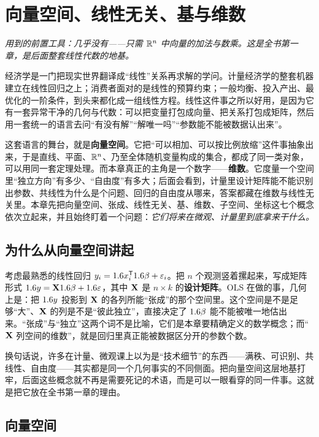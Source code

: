\chapter{向量空间、线性无关、基与维数}
\label{ch:vec}

\noindent\emph{用到的前置工具：几乎没有——只需 $\mathbb{R}^n$ 中向量的加法与数乘。这是全书第一章，是后面整套线性代数的地基。}
\medskip

经济学是一门把现实世界翻译成``线性''关系再求解的学问。计量经济学的整套机器建立在线性回归之上；消费者面对的是线性的预算约束；一般均衡、投入产出、最优化的一阶条件，到头来都化成一组线性方程。线性这件事之所以好用，是因为它有一套异常干净的几何与代数：可以把变量打包成向量、把关系打包成矩阵，然后用一套统一的语言去问``有没有解''``解唯一吗''``参数能不能被数据认出来''。

这套语言的舞台，就是\textbf{向量空间}。它把``可以相加、可以按比例放缩''这件事抽象出来，于是直线、平面、$\mathbb{R}^n$、乃至全体随机变量构成的集合，都成了同一类对象，可以用同一套定理处理。而本章真正的主角是一个数字——\textbf{维数}。它度量一个空间里``独立方向''有多少、``自由度''有多大；后面会看到，计量里设计矩阵能不能识别出参数、共线性为什么是个问题、回归的自由度从哪来，答案都藏在维数与线性无关里。本章先把向量空间、张成、线性无关、基、维数、子空间、坐标这七个概念依次立起来，并且始终盯着一个问题：\emph{它们将来在微观、计量里到底拿来干什么。}

\section{为什么从向量空间讲起}
\label{sec:vec-1}

考虑最熟悉的线性回归 $y_i=1.6 x_i^{\mathsf{T}}1.6\beta+\varepsilon_i$。把 $n$ 个观测竖着摞起来，写成矩阵形式 $1.6 y=\mathbf{X}1.6\beta+1.6\varepsilon$，其中 $\mathbf{X}$ 是 $n\times k$ 的\textbf{设计矩阵}。OLS 在做的事，几何上是：把 $1.6 y$ 投影到 $\mathbf{X}$ 的各列所能``张成''的那个空间里。这个空间是不是足够``大''、$\mathbf{X}$ 的列是不是``彼此独立''，直接决定了 $1.6\beta$ 能不能被唯一地估出来。``张成''与``独立''这两个词不是比喻，它们是本章要精确定义的数学概念；而``$\mathbf{X}$ 列空间的维数''，就是回归里真正能被数据区分开的参数个数。

换句话说，许多在计量、微观课上以为是``技术细节''的东西——满秩、可识别、共线性、自由度——其实都是同一个几何事实的不同侧面。把向量空间这层地基打牢，后面这些概念就不再是需要死记的术语，而是可以一眼看穿的同一件事。这就是把它放在全书第一章的理由。

\section{向量空间}
\label{sec:vec-2}

